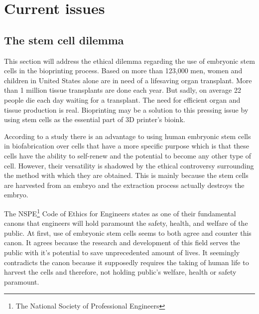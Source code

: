 \documentclass[12pt]{article} %
\begin{document}
\newpage


\section{Current issues} %

\subsection{The stem cell dilemma} %

This section will address the ethical dilemma regarding the use of embryonic stem cells in the bioprinting process. 
Based on \cite{OPTN data as of January 2015} more than 123,000 men, women and children in United States alone are in need of a lifesaving organ transplant. More than 1 million tissue transplants are done each year. But sadly, on average 22 people die each day waiting for a transplant. The need for efficient organ and tissue production is real. Bioprinting may be a solution to this pressing issue by using stem cells as the essential part of 3D printer's bioink.

According to a study \cite{Faulkner-Jones:2013} there is an advantage to using human embryonic stem cells in biofabrication over cells that have a more specific purpose which is that these cells have the ability to self-renew and the potential to become any other type of cell. However, their versatility is shadowed by the ethical controversy surrounding the method with which they are obtained. This is mainly because the stem cells are harvested from an embryo and the extraction process actually destroys the embryo. 

The NSPE\footnote{The National Society of Professional Engineers} Code of Ethics for Engineers states as one of their fundamental canons that engineers will hold paramount the safety, health, and welfare of the public. At first, use of embryonic stem cells seems to both agree and counter this canon. 
It agrees because the research and development of this field serves the public with it's potential to save unprecedented amount of lives. 
It seemingly contradicts the canon because it supposedly requires the taking of human life to harvest the cells and therefore, not holding public's welfare, health or safety paramount. 
\end{document}
